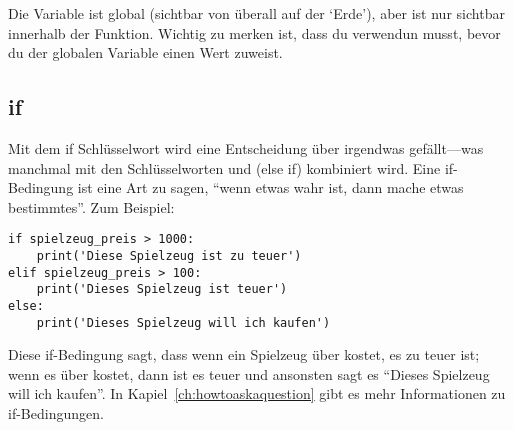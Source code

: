 Die Variable  ist global (sichtbar von überall auf der `Erde'), aber  ist nur sichtbar innerhalb der Funktion. Wichtig zu merken ist, dass du  verwendun musst, bevor du der globalen Variable einen Wert zuweist.

\subsection*{if}

Mit dem if Schlüsselwort wird eine Entscheidung über irgendwas gefällt---was manchmal mit den Schlüsselworten  und  (else if) kombiniert wird. Eine if-Bedingung ist eine Art zu sagen, ``wenn etwas wahr ist, dann mache etwas bestimmtes''. Zum Beispiel:

\begin{Verbatim}[frame=single]
if spielzeug_preis > 1000:
    print('Diese Spielzeug ist zu teuer')
elif spielzeug_preis > 100:
    print('Dieses Spielzeug ist teuer')
else:
    print('Dieses Spielzeug will ich kaufen')
\end{Verbatim}

Diese if-Bedingung sagt, dass wenn ein Spielzeug über  kostet, es zu teuer ist; wenn es über  kostet, dann ist es teuer und ansonsten sagt es ``Dieses Spielzeug will ich kaufen''. In Kapiel~\ref{ch:howtoaskaquestion} gibt es mehr Informationen zu if-Bedingungen.

